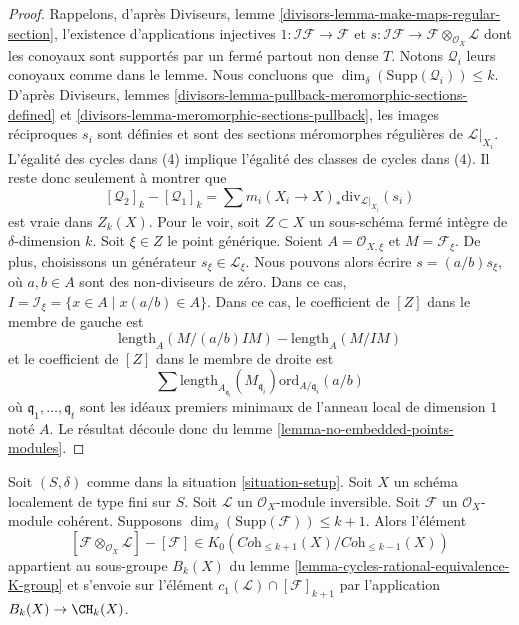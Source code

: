 \begin{proof}
Rappelons, d'après Diviseurs, lemme \ref{divisors-lemma-make-maps-regular-section},
l'existence d'applications injectives
$1 : \mathcal{I}\mathcal{F} \to \mathcal{F}$ et
$s : \mathcal{I}\mathcal{F} \to \mathcal{F} \otimes_{\mathcal{O}_X}\mathcal{L}$
dont les conoyaux sont supportés par un fermé partout non dense $T$.
Notons $\mathcal{Q}_i$ leurs conoyaux comme dans le lemme.
Nous concluons que $\dim_\delta(\text{Supp}(\mathcal{Q}_i)) \leq k$.
D'après Diviseurs, lemmes \ref{divisors-lemma-pullback-meromorphic-sections-defined}
et \ref{divisors-lemma-meromorphic-sections-pullback}, les images réciproques $s_i$
sont définies et sont des sections méromorphes régulières de $\mathcal{L}|_{X_i}$.
L'égalité des cycles dans (4) implique l'égalité des classes de cycles
dans (4). Il reste donc seulement à montrer que
$$
[\mathcal{Q}_2]_k - [\mathcal{Q}_1]_k
=
\sum m_i(X_i \to X)_*\text{div}_{\mathcal{L}|_{X_i}}(s_i)
$$
est vraie dans $Z_k(X)$. Pour le voir, soit $Z \subset X$ un sous-schéma fermé intègre
de $\delta$-dimension $k$. Soit $\xi \in Z$ le point générique.
Soient $A = \mathcal{O}_{X, \xi}$ et $M = \mathcal{F}_\xi$.
De plus, choisissons un générateur $s_\xi \in \mathcal{L}_\xi$.
Nous pouvons alors écrire $s = (a/b) s_\xi$, où $a, b \in A$ sont des
non-diviseurs de zéro. Dans ce cas,
$I = \mathcal{I}_\xi = \{x \in A \mid x(a/b) \in A\}$.
Dans ce cas, le coefficient de $[Z]$ dans le membre de gauche est
$$
\text{length}_A(M/(a/b)IM) - \text{length}_A(M/IM)
$$
et le coefficient de $[Z]$ dans le membre de droite
est
$$
\sum
\text{length}_{A_{\mathfrak q_i}}(M_{\mathfrak q_i})
\text{ord}_{A/\mathfrak q_i}(a/b)
$$
où $\mathfrak q_1, \ldots, \mathfrak q_t$ sont les idéaux premiers minimaux
de l'anneau local de dimension $1$ noté $A$. Le résultat
découle donc du lemme \ref{lemma-no-embedded-points-modules}.
\end{proof}

\begin{lemma}
\label{lemma-coherent-sheaf-cap-c1}
Soit $(S, \delta)$ comme dans la situation \ref{situation-setup}.
Soit $X$ un schéma localement de type fini sur $S$.
Soit $\mathcal{L}$ un $\mathcal{O}_X$-module inversible.
Soit $\mathcal{F}$ un $\mathcal{O}_X$-module cohérent.
Supposons $\dim_\delta(\text{Supp}(\mathcal{F})) \leq k + 1$.
Alors l'élément
$$
[\mathcal{F} \otimes_{\mathcal{O}_X} \mathcal{L}]
-
[\mathcal{F}]
\in
K_0(\textit{Coh}_{\leq k + 1}(X)/\textit{Coh}_{\leq k - 1}(X))
$$
appartient au sous-groupe $B_k(X)$ du
lemme \ref{lemma-cycles-rational-equivalence-K-group} et s'envoie sur
l'élément $c_1(\mathcal{L}) \cap [\mathcal{F}]_{k + 1}$ par
l'application $B_k(X) \to \CH_k(X)$.
\end{lemma}

